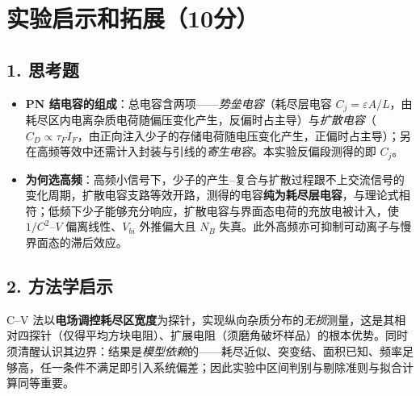 \documentclass[12pt,a4paper]{ctexart}
\begin{document}
\section*{实验启示和拓展（10分）}

\subsection*{1. 思考题}
\begin{itemize}
    \item \textbf{PN 结电容的组成}：总电容含两项——\emph{势垒电容}（耗尽层电容 $C_j=\varepsilon A/L$，由耗尽区内电离杂质电荷随偏压变化产生，反偏时占主导）与\emph{扩散电容}（$C_D\propto\tau_F I_F$，由正向注入少子的存储电荷随电压变化产生，正偏时占主导）；另在高频等效中还需计入封装与引线的\emph{寄生电容}。本实验反偏段测得的即 $C_j$。
    \item \textbf{为何选高频}：高频小信号下，少子的产生--复合与扩散过程跟不上交流信号的变化周期，扩散电容支路等效开路，测得的电容\textbf{纯为耗尽层电容}，与理论式相符；低频下少子能够充分响应，扩散电容与界面态电荷的充放电被计入，使 $1/C^{2}$--$V$ 偏离线性、$V_{bi}$ 外推偏大且 $N_B$ 失真。此外高频亦可抑制可动离子与慢界面态的滞后效应。
\end{itemize}

\subsection*{2. 方法学启示}
C--V 法以\textbf{电场调控耗尽区宽度}为探针，实现纵向杂质分布的\emph{无损}测量，这是其相对四探针（仅得平均方块电阻）、扩展电阻（须磨角破坏样品）的根本优势。同时须清醒认识其边界：结果是\emph{模型依赖}的——耗尽近似、突变结、面积已知、频率足够高，任一条件不满足即引入系统偏差；因此实验中区间判别与剔除准则与拟合计算同等重要。
\end{document}
